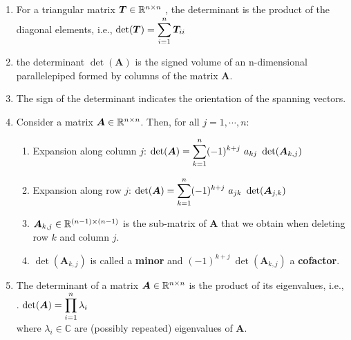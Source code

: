 \begin{enumerate}
    \item For a triangular matrix $\bm{T} \in \mathbb{R}^{n\times n}$ , the determinant is the product of the diagonal elements, i.e., $\det(\bm{T}) = \displaystyle\sum ^n _{i=1} \bm{T}_{ii}$
    \hfill \cite{mfml/book/mml/Deisenroth-Faisal-Ong}

    \item the determinant $\det(\bm{A})$ is the signed volume of an n-dimensional parallelepiped formed by columns of the matrix $\bm{A}$.
    \hfill \cite{mfml/book/mml/Deisenroth-Faisal-Ong}

    \item The sign of the determinant indicates the orientation of the spanning vectors.
    \hfill \cite{mfml/book/mml/Deisenroth-Faisal-Ong}

    \item
    \begin{theorem}
    Consider a matrix $\bm{A} \in \mathbb{R}^{n\times n}$. Then, for all $j = 1, \cdots , n$:
    \hfill \cite{mfml/book/mml/Deisenroth-Faisal-Ong}
    \end{theorem}
    \begin{enumerate}
        \item Expansion along column $j$:
        $
            \det(\bm{A}) = \displaystyle\sum^n _{k=1} (-1)^{k+j}\  a_{kj}\ \det(\bm{A}_{k,j} )
        $
        \hfill \cite{mfml/book/mml/Deisenroth-Faisal-Ong}

        \item Expansion along row $j$:
        $
            \det(\bm{A}) = \displaystyle\sum^n _{k=1} (-1)^{k+j}\  a_{jk}\ \det(\bm{A}_{j,k} )
        $
        \hfill \cite{mfml/book/mml/Deisenroth-Faisal-Ong}

        \item $\bm{A}_{k,j} \in \mathbb{R}^{(n-1)\times(n-1)}$ is the sub-matrix of $\bm{A}$ that we obtain when deleting row $k$ and column $j$.
        \hfill \cite{mfml/book/mml/Deisenroth-Faisal-Ong}

        \item $\det(\bm{A}_{k,j} )$ is called a \textbf{minor} and $(-1)^{k+j}\ \det(\bm{A}_{k,j} )$ a \textbf{cofactor}.
        \hfill \cite{mfml/book/mml/Deisenroth-Faisal-Ong}
    \end{enumerate}

    \item \begin{theorem}
        The determinant of a matrix $\bm{A} \in \mathbb{R}^{n\times n}$ is the product of its eigenvalues, i.e.,
        \hfill \cite{mfml/book/mml/Deisenroth-Faisal-Ong}
        \\
        .\hfill
        $
            \det(\bm{A}) = \displaystyle\prod_{i=1}^{n} \lambda_i
        $
        \hfill \cite{mfml/book/mml/Deisenroth-Faisal-Ong}
        \\
        where $\lambda_i \in \mathbb{C}$ are (possibly repeated) eigenvalues of $\bm{A}$.
        \hfill \cite{mfml/book/mml/Deisenroth-Faisal-Ong}
    \end{theorem}

\end{enumerate}



